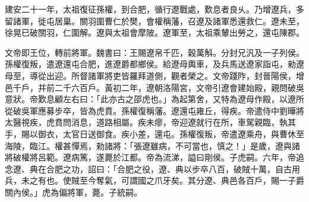 \begin{pinyinscope}
建安二十一年，太祖復征孫權，到合肥，循行遼戰處，歎息者良乆。乃增遼兵，多留諸軍，徙屯居巢。關羽圍曹仁於樊，會權稱藩，召遼及諸軍悉還救仁。遼未至，徐晃已破關羽，仁圍解。遼與太祖會摩陂。遼軍至，太祖乘輦出勞之，還屯陳郡。

文帝即王位，轉前將軍。魏書曰：王賜遼帛千匹，穀萬斛。分封兄汎及一子列侯。孫權復叛，遣遼還屯合肥，進遼爵都鄉侯。給遼母輿車，及兵馬送遼家詣屯，勑遼母至，導從出迎。所督諸軍將吏皆羅拜道側，觀者榮之。文帝踐阼，封晉陽侯，增邑千戶，并前二千六百戶。黃初二年，遼朝洛陽宮，文帝引遼會建始殿，親問破吳意狀。帝歎息顧左右曰：「此亦古之邵虎也。」為起第舍，又特為遼母作殿，以遼所從破吳軍應募步卒，皆為虎賁。孫權復稱藩。遼還屯雍丘，得疾。帝遣侍中劉曄將太醫視疾，虎賁問消息，道路相屬。疾未瘳，帝迎遼就行在所，車駕親臨，執其手，賜以御衣，太官日送御食。疾小差，還屯。孫權復叛，帝遣遼乘舟，與曹休至海陵，臨江。權甚憚焉，勑諸將：「張遼雖病，不可當也，慎之！」是歲，遼與諸將破權將呂範。遼病篤，遂薨於江都。帝為流涕，謚曰剛侯。子虎嗣。六年，帝追念遼、典在合肥之功，詔曰：「合肥之役，遼、典以步卒八百，破賊十萬，自古用兵，未之有也。使賊至今奪氣，可謂國之爪牙矣。其分遼、典邑各百戶，賜一子爵關內侯。」虎為偏將軍，薨。子統嗣。


\end{pinyinscope}